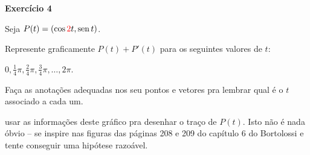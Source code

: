\documentclass[oneside,12pt]{article}
\begin{document}
{\bf Exercício 4}

Seja $P(t) = (\cos \ColorRed{2}t, \sen t)$.

Represente graficamente $P(t)+P'(t)$ para os seguintes valores de $t$:

$0, \frac14π, \frac24π, \frac34π, \ldots, 2π$.

Faça as anotações adequadas nos seu pontos e vetores pra lembrar qual
é o $t$ associado a cada um.

\msk

 usar as informações deste gráfico pra desenhar o
traço de $P(t)$. Isto não é nada óbvio -- se inspire nas figuras das
páginas 208 e 209 do capítulo 6 do Bortolossi e tente conseguir uma
hipótese razoável.


\msk









\end{document}
